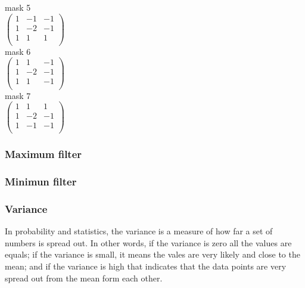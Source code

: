 \documentclass[a4paper]{article}
\begin{document}
mask 5 \\

\begin{math}
   \begin{pmatrix} 
   1 & -1 & -1 \\ 
   1 & -2 & -1 \\
   1 & 1 & 1 \\ 
   \end{pmatrix}
\end{math}\\

mask 6 \\

\begin{math}
   \begin{pmatrix} 
   1 & 1 & -1 \\ 
   1 & -2 & -1 \\
   1 & 1 & -1 \\ 
   \end{pmatrix}
\end{math}\\

mask 7 \\

\begin{math}
   \begin{pmatrix} 
   1 & 1 & 1 \\ 
   1 & -2 & -1 \\
   1 & -1 & -1 \\ 
   \end{pmatrix}
\end{math}\\

\subsubsection{Maximum filter}
\subsubsection{Minimun filter}
\subsubsection{Variance}

In probability and statistics, the variance is a measure of how far a set of numbers is spread out. In other words, if the variance is zero all the values are equals; if the variance is small, it means the vales are very likely and close  to the mean; and if the variance is high that indicates that the data points are very spread out from the mean form each other.
\end{document}
